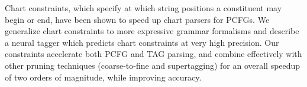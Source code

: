 Chart constraints, which specify at which string positions a constituent may begin or end, have been shown to speed up chart parsers for PCFGs. We generalize chart constraints to more expressive grammar formalisms and describe a neural tagger which predicts chart constraints at very high precision. Our constraints accelerate both PCFG and TAG parsing, and combine effectively with other pruning techniques (coarse-to-fine and supertagging) for an overall speedup of two orders of magnitude, while improving accuracy.
